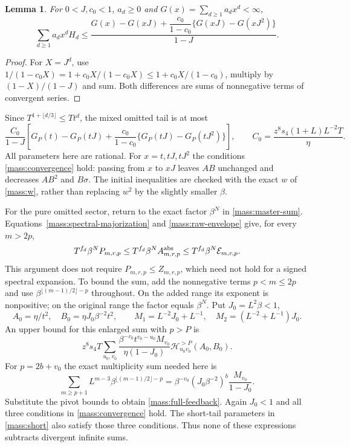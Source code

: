 \documentclass[11pt]{amsart}
\newtheorem{lemma}[theorem]{Lemma}
\theoremstyle{definition}
\theoremstyle{remark}
\numberwithin{equation}{section}
\begin{document}
\begin{lemma}\label{mass:three-evaluation}
For $0<J,c_0<1$, $a_d\ge0$ and $G(x)=\sum_{d\ge1}a_dx^d<\infty$,
\[
 \sum_{d\ge1}a_dx^dH_d\le
 \frac{G(x)-G(xJ)+\dfrac{c_0}{1-c_0}
              \{G(xJ)-G(xJ^2)\}}{1-J}.
\]
\end{lemma}
\begin{proof}
For $X=J^d$, use
$1/(1-c_0X)=1+c_0X/(1-c_0X)\le1+c_0X/(1-c_0)$,
multiply by $(1-X)/(1-J)$ and sum. Both differences are sums of
nonnegative terms of convergent series.
\end{proof}

Since $T^{1+\lfloor d/3\rfloor}\le Tt^d$, the mixed omitted tail is
at most
\begin{equation}\label{mass:mixed}
 \frac{C_0}{1-J}\left[
 G_P(t)-G_P(tJ)+\frac{c_0}{1-c_0}\{G_P(tJ)-G_P(tJ^2)\}\right],
 \qquad C_0=\frac{z^8s_4(1+L)L^{-2}T}{\eta}.
\end{equation}
All parameters here are rational. For $x=t,tJ,tJ^2$ the conditions
\eqref{mass:convergence} hold: passing from $x$ to $xJ$ leaves $AB$
unchanged and decreases $AB^2$ and $B\sigma$. The initial inequalities
are checked with the exact $w$ of \eqref{mass:w}, rather than replacing
$w^2$ by the slightly smaller $\beta$.

For the pure omitted sector, return to the exact factor $\beta^N$
in \eqref{mass:master-sum}. Equations~\eqref{mass:spectral-majorization}
and \eqref{mass:raw-envelope} give, for every $m>2p$,
\[
 T^{f_d}\beta^N P_{m,r,p}
 \le T^{f_d}\beta^N A^{\rm abs}_{m,r,p}
 \le T^{f_d}\beta^N\mathcal E_{m,r,p}.
\]
This argument does not require $P_{m,r,p}\le Z_{m,r,p}$, which need
not hold for a signed spectral expansion. To bound the sum, add the
nonnegative terms $p<m\le2p$ and use
$\beta^{\lfloor(m-1)/2\rfloor-p}$ throughout. On the added range its
exponent is nonpositive; on the original range the factor equals $\beta^N$.
Put
$J_0=L^2\beta<1$,
\[
 A_0=\eta/t^2,\quad B_0=\eta J_0\beta^{-2}t^2,\qquad
 M_1=L^{-2}J_0+L^{-1},\quad M_2=(L^{-2}+L^{-1})J_0.
\]
An upper bound for this enlarged sum with $p>P$ is
\begin{equation}\label{mass:full-feedback}
 z^8s_4T\sum_{u_0,v_0}
 \frac{\beta^{-v_0}t^{v_0-u_0}M_{v_0}}{\eta(1-J_0)}
 \mathcal H^{>P}_{u_0v_0}(A_0,B_0).
\end{equation}
For $p=2b+v_0$ the exact multiplicity sum needed here is
\[
 \sum_{m\ge p+1} L^{m-3}\beta^{\lfloor(m-1)/2\rfloor-p}
 =\beta^{-v_0}(J_0\beta^{-2})^b
     \frac{M_{v_0}}{1-J_0}.
\]
Substitute the pivot bounds to obtain \eqref{mass:full-feedback}.
Again $J_0<1$ and all three conditions in \eqref{mass:convergence}
hold. The short-tail parameters in \eqref{mass:short} also satisfy
those three conditions. Thus none of these expressions subtracts
divergent infinite sums.
\end{document}
